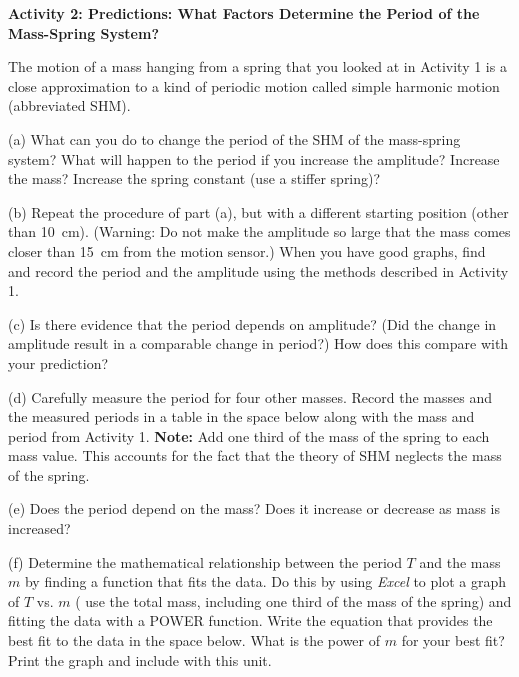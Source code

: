 \bigskip

\textbf{Activity 2: Predictions:  What Factors Determine the Period of the Mass-Spring System? }

The motion of a mass hanging from a spring that you looked at in Activity 1
is a close approximation to a kind of periodic motion called simple harmonic
motion (abbreviated SHM).

(a) What can you do to change the period of the SHM of the mass-spring system? What
will happen to the period if you increase the amplitude? Increase the mass?
Increase the spring constant (use a stiffer spring)?
\answerspace{20mm}

(b) Repeat the procedure of part (a), but with a different starting position
(other than 10~cm). (Warning: Do not make the amplitude so large that the mass
comes closer than 15~cm from the motion sensor.) When you have good graphs,
find and record the period and the amplitude using the methods described in
Activity 1. 
\answerspace{15mm}


(c) Is there evidence that the period depends on amplitude? (Did the change
in amplitude result in a comparable change in period?) How does this
compare with your prediction?
\answerspace{10mm}

\pagebreak[2]
(d) Carefully measure the period for four other masses. Record the masses and
the measured periods in a table in the space below along with the mass and 
period from Activity 1. %
\textbf{Note:} Add one third of the mass of the spring to each mass value. This accounts for the fact that the theory of SHM neglects the mass of the spring.
\answerspace{35mm}

(e) Does the period depend on the mass? Does it increase or decrease as mass
is increased?
\answerspace{15mm}

(f) Determine the mathematical relationship between the period $T$ and the mass
$m$ by finding a function that fits the data. Do this by using \textit{Excel} to plot 
a graph of $T$ vs. $m$ (%
use the total mass, including one third of the mass of the spring) and fitting the data with a POWER function. Write the equation that provides the best fit to the data in the space below. What is the power of $m$ for your best fit? Print the graph and include with this unit.
\answerspace{20mm}

